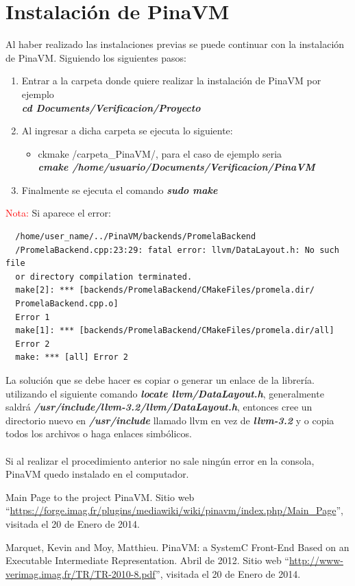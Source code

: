 \documentclass[12pt,graphicx,caption,rotating]{article}
\begin{document}
\section{Instalación de PinaVM}
\noindent
Al haber realizado las instalaciones previas se puede continuar con la instalación de PinaVM. Siguiendo los siguientes pasos:
\begin{enumerate}
 \item Entrar a la carpeta donde quiere realizar la instalación de PinaVM por ejemplo\\
	\textbf{\textit{cd Documents/Verificacion/Proyecto}}
 \item Al ingresar a dicha carpeta se ejecuta lo siguiente:
 \begin{itemize}
  \item ckmake /carpeta\_PinaVM/, para el caso de ejemplo seria\\
  \textbf{\textit{cmake /home/usuario/Documents/Verificacion/PinaVM}}
 \end{itemize}
 \item Finalmente se ejecuta el comando \textbf{\textit{sudo make}}
\end{enumerate}
\noindent
\textcolor{red}{Nota:} Si aparece el error:
 \begin{verbatim}
  /home/user_name/../PinaVM/backends/PromelaBackend
  /PromelaBackend.cpp:23:29: fatal error: llvm/DataLayout.h: No such file
  or directory compilation terminated.
  make[2]: *** [backends/PromelaBackend/CMakeFiles/promela.dir/
  PromelaBackend.cpp.o]
  Error 1
  make[1]: *** [backends/PromelaBackend/CMakeFiles/promela.dir/all]
  Error 2
  make: *** [all] Error 2
 \end{verbatim}
La solución que se debe hacer es copiar o generar un enlace de la librería. utilizando el siguiente comando \textbf{\textit{locate llvm/DataLayout.h}}, generalmente saldrá \textbf{\textit{/usr/include/llvm-3.2/llvm/DataLayout.h}}, entonces cree un directorio nuevo en \textbf{\textit{/usr/include}} llamado llvm en vez de \textbf{\textit{llvm-3.2}} y o copia todos los archivos o haga enlaces simbólicos.\\\\
Si al realizar el procedimiento anterior no sale ningún error en la consola, PinaVM quedo instalado en el computador.


\begin{thebibliography}{99}

 Main Page to the project PinaVM. Sitio web ``\url{https://forge.imag.fr/plugins/mediawiki/wiki/pinavm/index.php/Main_Page}'', visitada el 20 de Enero de 2014.

 Marquet, Kevin and Moy, Matthieu. PinaVM: a SystemC Front-End Based on an Executable Intermediate Representation. Abril de 2012. Sitio web ``\url{http://www-verimag.imag.fr/TR/TR-2010-8.pdf}'', visitada el 20 de Enero de 2014.

\end{thebibliography}
\end{document}
